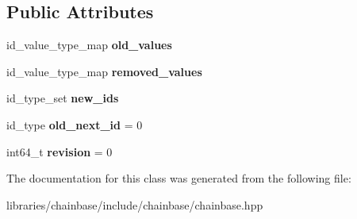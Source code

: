 \subsection*{Public Attributes}
\begin{DoxyCompactItemize}
\item 
\mbox{\label{classchainbase_1_1undo__state_adcf17a1af4fdb965ece2e7a3144b48df}} 
id\+\_\+value\+\_\+type\+\_\+map {\bfseries old\+\_\+values}
\item 
\mbox{\label{classchainbase_1_1undo__state_a44df0c7d8c5714cf402e3fd9f9880b5c}} 
id\+\_\+value\+\_\+type\+\_\+map {\bfseries removed\+\_\+values}
\item 
\mbox{\label{classchainbase_1_1undo__state_ad80b0db75257f293bf3aaeada35d7bb7}} 
id\+\_\+type\+\_\+set {\bfseries new\+\_\+ids}
\item 
\mbox{\label{classchainbase_1_1undo__state_ae0a7cbf8df73de52a101b8cdbf13b6a5}} 
id\+\_\+type {\bfseries old\+\_\+next\+\_\+id} = 0
\item 
\mbox{\label{classchainbase_1_1undo__state_a9497e0d430df519bcd23704f3ab04a36}} 
int64\+\_\+t {\bfseries revision} = 0
\end{DoxyCompactItemize}


The documentation for this class was generated from the following file\+:\begin{DoxyCompactItemize}
\item 
libraries/chainbase/include/chainbase/chainbase.\+hpp\end{DoxyCompactItemize}
